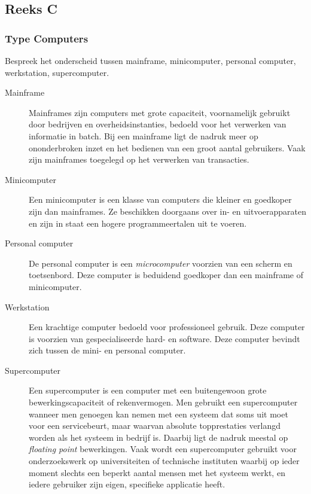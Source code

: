 \documentclass[../main.tex]{subfiles}
\begin{document}
\subsection{Reeks C}
\subsubsection{Type Computers}
\begin{question}
Bespreek het onderscheid tussen mainframe, minicomputer, personal computer, werkstation, supercomputer.
\end{question}
\begin{solution}
\begin{description}
	\item[Mainframe] Mainframes zijn computers met grote capaciteit, voornamelijk gebruikt door bedrijven en overheidsinstanties, bedoeld voor het verwerken van informatie in batch. Bij een mainframe ligt de nadruk meer op ononderbroken inzet en het bedienen van een groot aantal gebruikers. Vaak zijn mainframes toegelegd op het verwerken van transacties.
	\item[Minicomputer] Een minicomputer is een klasse van computers die kleiner en goedkoper zijn dan mainframes. Ze beschikken doorgaans over in- en uitvoerapparaten en zijn in staat een hogere programmeertalen uit te voeren.
	\item[Personal computer] De personal computer is een \emph{microcomputer} voorzien van een scherm en toetsenbord. Deze computer is beduidend goedkoper dan een mainframe of minicomputer.
	\item[Werkstation] Een krachtige computer bedoeld voor professioneel gebruik. Deze computer is voorzien van gespecialiseerde hard- en software. Deze computer bevindt zich tussen de mini- en personal computer.
	\item[Supercomputer] Een supercomputer is een computer met een buitengewoon grote bewerkingscapaciteit of rekenvermogen.  Men gebruikt een supercomputer wanneer men genoegen kan nemen met een systeem dat soms uit moet voor een servicebeurt, maar waarvan absolute topprestaties verlangd worden als het systeem in bedrijf is. Daarbij ligt de nadruk meestal op \emph{floating point} bewerkingen. Vaak wordt een supercomputer gebruikt voor onderzoekswerk op universiteiten of technische instituten waarbij op ieder moment slechts een beperkt aantal mensen met het systeem werkt, en iedere gebruiker zijn eigen, specifieke applicatie heeft.
\end{description}
\end{solution}
\end{document}
